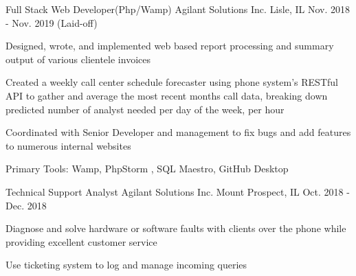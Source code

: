 


\begin{cventries}



\cventry
{ Full Stack Web Developer(Php/Wamp)} %
{Agilant Solutions Inc.} %
{Lisle, IL} %
{Nov. 2018 - Nov. 2019 (Laid-off)} %
{ %
\begin{cvitems}
\item {Designed, wrote, and implemented web based report processing and summary output of various clientele invoices}
\item {Created a weekly call center schedule forecaster using phone system's RESTful API to gather and average the most recent months call data, breaking down predicted number of analyst needed per day of the week, per hour}
\item {Coordinated with Senior Developer and management to fix bugs and add features to numerous internal websites}
\item {Primary Tools: Wamp, PhpStorm , SQL Maestro, GitHub Desktop}
\end{cvitems}
}

\cventry
{Technical Support Analyst} %
{Agilant Solutions Inc.} %
{Mount Prospect, IL} %
{Oct. 2018 - Dec. 2018} %
{ %
\begin{cvitems}
\item {Diagnose and solve hardware or software faults with clients over the phone while providing excellent customer service}
\item {Use ticketing system to log and manage incoming queries}
\end{cvitems}
}



\end{cventries}